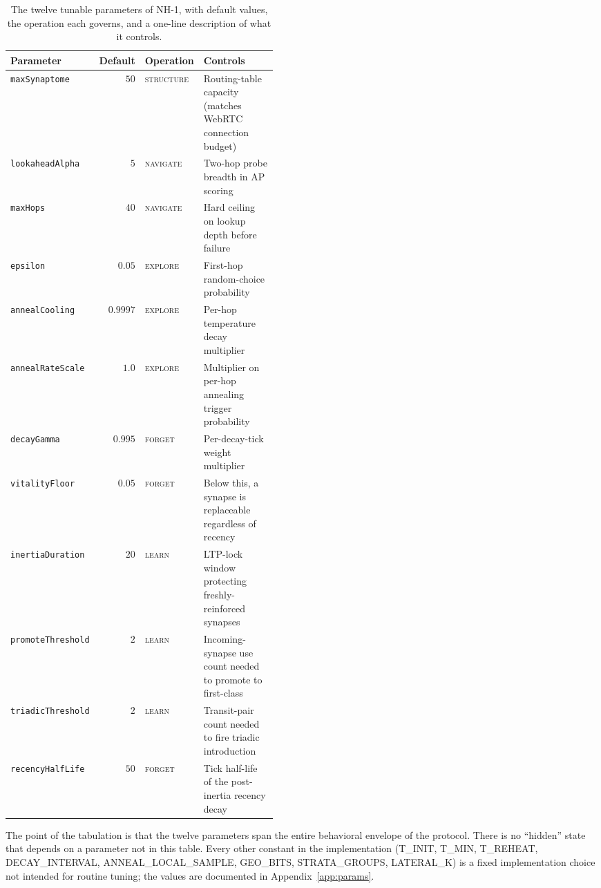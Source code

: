 \documentclass[twoside,nobib]{tufte-book}
\begin{document}
\begin{table}[h]
\centering
\small
\caption{The twelve tunable parameters of NH-1, with default
values, the operation each governs, and a one-line description
of what it controls.}
\label{tab:nh1-params}
\begin{tabular}{@{}lrlp{0.45\linewidth}@{}}
\toprule
\textbf{Parameter} & \textbf{Default} & \textbf{Operation} & \textbf{Controls} \\
\midrule
\texttt{maxSynaptome}      & $50$    & \textsc{structure} &
  Routing-table capacity (matches WebRTC connection budget) \\
\texttt{lookaheadAlpha}    & $5$     & \textsc{navigate}  &
  Two-hop probe breadth in AP scoring \\
\texttt{maxHops}           & $40$    & \textsc{navigate}  &
  Hard ceiling on lookup depth before failure \\
\texttt{epsilon}           & $0.05$  & \textsc{explore}   &
  First-hop random-choice probability \\
\texttt{annealCooling}     & $0.9997$ & \textsc{explore}  &
  Per-hop temperature decay multiplier \\
\texttt{annealRateScale}   & $1.0$   & \textsc{explore}   &
  Multiplier on per-hop annealing trigger probability \\
\texttt{decayGamma}        & $0.995$ & \textsc{forget}    &
  Per-decay-tick weight multiplier \\
\texttt{vitalityFloor}     & $0.05$  & \textsc{forget}    &
  Below this, a synapse is replaceable regardless of recency \\
\texttt{inertiaDuration}   & $20$    & \textsc{learn}     &
  LTP-lock window protecting freshly-reinforced synapses \\
\texttt{promoteThreshold}  & $2$     & \textsc{learn}     &
  Incoming-synapse use count needed to promote to first-class \\
\texttt{triadicThreshold}  & $2$     & \textsc{learn}     &
  Transit-pair count needed to fire triadic introduction \\
\texttt{recencyHalfLife}   & $50$    & \textsc{forget}    &
  Tick half-life of the post-inertia recency decay \\
\bottomrule
\end{tabular}
\end{table}

The point of the tabulation is that the twelve parameters span
the entire behavioral envelope of the protocol. There is no
``hidden'' state that depends on a parameter not in this table.
Every other constant in the implementation
(\textsc{T\_INIT}, \textsc{T\_MIN}, \textsc{T\_REHEAT},
\textsc{DECAY\_INTERVAL}, \textsc{ANNEAL\_LOCAL\_SAMPLE},
\textsc{GEO\_BITS}, \textsc{STRATA\_GROUPS},
\textsc{LATERAL\_K}) is a fixed implementation choice not
intended for routine tuning; the values are documented in
Appendix~\ref{app:params}.
\end{document}
